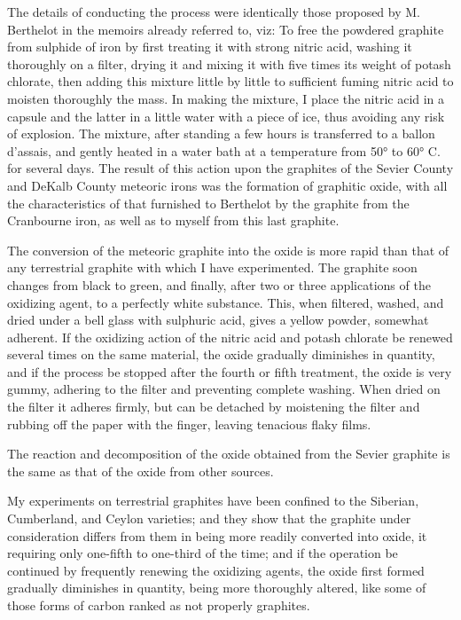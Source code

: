 \documentclass[a4paper, 11pt, oneside, english]{article}
\begin{document}
The details of conducting the process were identically those proposed by M. Berthelot in the memoirs already referred to, viz: To free the powdered graphite from sulphide of iron by first treating it with strong nitric acid, washing it thoroughly on a filter, drying it and mixing it with five times its weight of potash chlorate, then adding this mixture little by little to sufficient fuming nitric acid to moisten thoroughly the mass. In making the mixture, I place the nitric acid in a capsule and the latter in a little water with a piece of ice, thus avoiding any risk of explosion. The mixture, after standing a few hours is transferred to a ballon d'assais, and gently heated in a water bath at a temperature from 50° to 60° C. for several days. The result of this action upon the graphites of the Sevier County and DeKalb County meteoric irons was the formation of graphitic oxide, with all the characteristics of that furnished to Berthelot by the graphite from the Cranbourne iron, as well as to myself from this last graphite.

The conversion of the meteoric graphite into the oxide is more rapid than that of any terrestrial graphite with which I have experimented. The graphite soon changes from black to green, and finally, after two or three applications of the oxidizing agent, to a perfectly white substance. This, when filtered, washed, and dried under a bell glass with sulphuric acid, gives a yellow powder, somewhat adherent. If the oxidizing action of the nitric acid and potash chlorate be renewed several times on the same material, the oxide gradually diminishes in quantity, and if the process be stopped after the fourth or fifth treatment, the oxide is very gummy, adhering to the filter and preventing complete washing. When dried on the filter it adheres firmly, but can be detached by moistening the filter and rubbing off the paper with the finger, leaving tenacious flaky films.

The reaction and decomposition of the oxide obtained from the Sevier graphite is the same as that of the oxide from other sources.

My experiments on terrestrial graphites have been confined to the Siberian, Cumberland, and Ceylon varieties; and they show that the graphite under consideration differs from them in being more readily converted into oxide, it requiring only one-fifth to one-third of the time; and if the operation be continued by frequently renewing the oxidizing agents, the oxide first formed gradually diminishes in quantity, being more thoroughly altered, like some of those forms of carbon ranked as not properly graphites.
\end{document}
